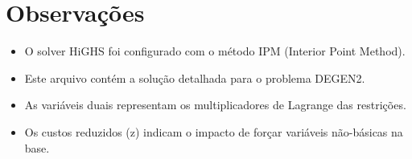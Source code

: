 \documentclass[12pt]{article}
\begin{document}
\section{Observações}

\begin{itemize}
\item O solver HiGHS foi configurado com o método IPM (Interior Point Method).
\item Este arquivo contém a solução detalhada para o problema DEGEN2.
\item As variáveis duais representam os multiplicadores de Lagrange das restrições.
\item Os custos reduzidos (z) indicam o impacto de forçar variáveis não-básicas na base.
\end{itemize}
\end{document}
